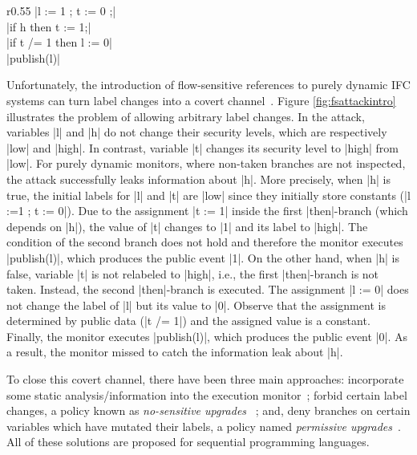\begin{wrapfigure}{r}{0.55\columnwidth}
|l := 1 ; t := 0 ;| \\
|if h then t := 1;| \\
|if t /= 1 then l := 0| \\
|publish(l)| 
\caption{\small\label{fig:fsattackintro} Flow-sensitive attack}
\end{wrapfigure}
Unfortunately, the introduction of flow-sensitive references to purely dynamic IFC
systems can turn label changes into a covert channel~\cite{Russo:2010}. 
Figure \ref{fig:fsattackintro} illustrates the problem of allowing arbitrary
label changes.  In the attack, variables |l| and |h| do not change their
security levels, which are respectively |low| and |high|. In contrast, variable |t|
changes its security level to |high| from |low|. For purely dynamic monitors, where
non-taken branches are not inspected, the attack successfully leaks information
about |h|. More precisely, when |h| is true, the initial labels for |l| and |t|
are |low| since they initially store constants (|l :=1 ; t := 0|).  Due to 
the assignment |t := 1| inside the
first |then|-branch (which depends on |h|), the value of |t| changes to |1| and its label to
|high|. The condition of the second branch does not hold and therefore 
the monitor executes |publish(l)|, which produces the public event 
|1|. On the other hand, when |h| is false, variable |t| is not relabeled to 
|high|, i.e., the first |then|-branch is not taken. Instead, the second
|then|-branch is executed. 
The assignment |l := 0| does not change the label of |l| but its value to 
 |0|. Observe that the assignment is determined by public data (|t /= 1|)
and the assigned value is a constant. Finally, the monitor executes
|publish(l)|, which produces the public event |0|. As a result, the monitor 
missed to catch the information leak about |h|.  

To close this covert channel, there have been three main approaches:
incorporate some static analysis/information into the execution
monitor~\cite{Russo:2010,stefan:lio,10.1109/SP.2013.10}; forbid certain label
changes, a policy known as \emph{no-sensitive
  upgrades}~%
; and, deny branches on certain
variables which have mutated their labels, a policy named \emph{permissive
  upgrades}~\cite{Austin:Flanagan:PLAS10}. All of these solutions are proposed
for sequential programming languages.


